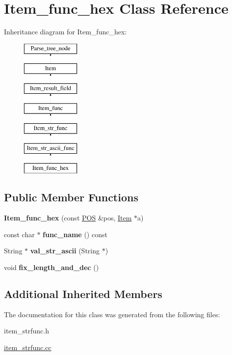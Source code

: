 \hypertarget{classItem__func__hex}{}\section{Item\+\_\+func\+\_\+hex Class Reference}
\label{classItem__func__hex}
Inheritance diagram for Item\+\_\+func\+\_\+hex\+:\begin{figure}[H]
\begin{center}
\leavevmode
\includegraphics[height=7.000000cm]{classItem__func__hex}
\end{center}
\end{figure}
\subsection*{Public Member Functions}
\begin{DoxyCompactItemize}
\item 
\mbox{\label{classItem__func__hex_acd03c4d0bd161d94278912afea7ead22}} 
{\bfseries Item\+\_\+func\+\_\+hex} (const \mbox{\hyperlink{structYYLTYPE}{P\+OS}} \&pos, \mbox{\hyperlink{classItem}{Item}} $\ast$a)
\item 
\mbox{\label{classItem__func__hex_a367821d66fbaf18d4032772bac724a70}} 
const char $\ast$ {\bfseries func\+\_\+name} () const
\item 
\mbox{\label{classItem__func__hex_a9c3074baa72909906a6eec76a51f7110}} 
String $\ast$ {\bfseries val\+\_\+str\+\_\+ascii} (String $\ast$)
\item 
\mbox{\label{classItem__func__hex_a9ddccf38baf34144740d558f37eddfb6}} 
void {\bfseries fix\+\_\+length\+\_\+and\+\_\+dec} ()
\end{DoxyCompactItemize}
\subsection*{Additional Inherited Members}


The documentation for this class was generated from the following files\+:\begin{DoxyCompactItemize}
\item 
item\+\_\+strfunc.\+h\item 
\mbox{\hyperlink{item__strfunc_8cc}{item\+\_\+strfunc.\+cc}}\end{DoxyCompactItemize}
